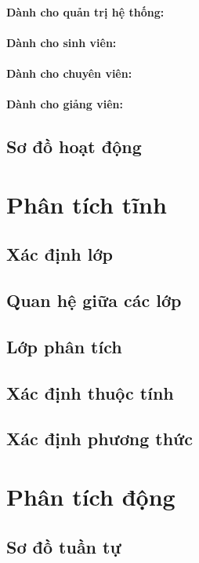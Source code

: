 \documentclass{article}
\begin{document}
  \paragraph{Dành cho quản trị hệ thống:}

  \paragraph{Dành cho sinh viên:}

  \paragraph{Dành cho chuyên viên:}

  \paragraph{Dành cho giảng viên:}

  \subsection{Sơ đồ hoạt động}

\section{Phân tích tĩnh}

  \subsection{Xác định lớp}

  \subsection{Quan hệ giữa các lớp}

  \subsection{Lớp phân tích}

  \subsection{Xác định thuộc tính}

  \subsection{Xác định phương thức}


\section{Phân tích động}

  \subsection{Sơ đồ tuần tự}
\end{document}
